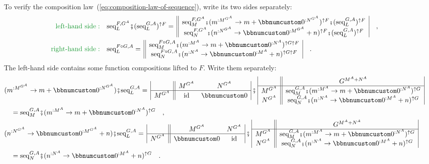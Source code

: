 To verify the composition law~(\ref{eq:composition-law-of-sequence}),
write its two sides separately:
\begin{align*}
{\color{greenunder}\text{left-hand side}:}\quad & \text{seq}_{L}^{F,G^{A}}\bef(\text{seq}_{L}^{G,A})^{\uparrow F}=\,\begin{array}{||c|}
\text{seq}_{M}^{F,G^{A}}\bef(m^{:M^{G^{A}}}\rightarrow m+\bbnum 0^{:N^{G^{A}}})^{\uparrow F}\bef(\text{seq}_{L}^{G,A})^{\uparrow F}\\
\text{seq}_{N}^{F,G^{A}}\bef(n^{:N^{G^{A}}}\rightarrow\bbnum 0^{:M^{G^{A}}}+n)^{\uparrow F}\bef(\text{seq}_{L}^{G,A})^{\uparrow F}
\end{array}\quad,\\
{\color{greenunder}\text{right-hand side}:}\quad & \text{seq}_{L}^{F\circ G,A}=\,\begin{array}{||c|}
\text{seq}_{M}^{F\circ G,A}\bef(m^{:M^{A}}\rightarrow m+\bbnum 0^{:N^{A}})^{\uparrow G\uparrow F}\\
\text{seq}_{N}^{F\circ G,A}\bef(n^{:N^{A}}\rightarrow\bbnum 0^{:M^{A}}+n)^{\uparrow G\uparrow F}
\end{array}\quad.
\end{align*}
The left-hand side contains some function compositions lifted to $F$.
Write them separately:
\begin{align*}
 & (m^{:M^{G^{A}}}\rightarrow m+\bbnum 0^{:N^{G^{A}}})\bef\text{seq}_{L}^{G,A}=\,\begin{array}{|c||cc|}
 & M^{G^{A}} & N^{G^{A}}\\
\hline M^{G^{A}} & \text{id} & \bbnum 0
\end{array}\,\bef\,\begin{array}{|c||c|}
 & G^{M^{A}+N^{A}}\\
\hline M^{G^{A}} & \text{seq}_{M}^{G,A}\bef(m^{:M^{A}}\rightarrow m+\bbnum 0^{:N^{A}})^{\uparrow G}\\
N^{G^{A}} & \text{seq}_{N}^{G,A}\bef(n^{:N^{A}}\rightarrow\bbnum 0^{:M^{A}}+n)^{\uparrow G}
\end{array}\\
 & \quad=\text{seq}_{M}^{G,A}\bef(m^{:M^{A}}\rightarrow m+\bbnum 0^{:N^{A}})^{\uparrow G}\quad,\\
 & (n^{:N^{G^{A}}}\rightarrow\bbnum 0^{:M^{G^{A}}}+n)\bef\text{seq}_{L}^{G,A}=\,\begin{array}{|c||cc|}
 & M^{G^{A}} & N^{G^{A}}\\
\hline N^{G^{A}} & \bbnum 0 & \text{id}
\end{array}\,\bef\,\begin{array}{|c||c|}
 & G^{M^{A}+N^{A}}\\
\hline M^{G^{A}} & \text{seq}_{M}^{G,A}\bef(m^{:M^{A}}\rightarrow m+\bbnum 0^{:N^{A}})^{\uparrow G}\\
N^{G^{A}} & \text{seq}_{N}^{G,A}\bef(n^{:N^{A}}\rightarrow\bbnum 0^{:M^{A}}+n)^{\uparrow G}
\end{array}\\
 & \quad=\text{seq}_{N}^{G,A}\bef(n^{:N^{A}}\rightarrow\bbnum 0^{:M^{A}}+n)^{\uparrow G}\quad.
\end{align*}
